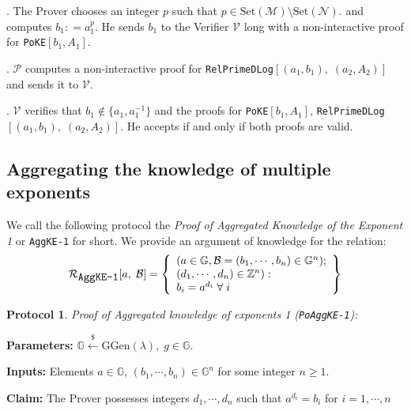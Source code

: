 \documentclass[11pt, lettersize, notitlepage, leqno, footskip=0.6cm]{article}
\newcommand{\bz}{\mathbb Z}
\newcommand{\sett}{\mr{Set}}
\newcommand{\mc}{\mathcal}
\newcommand{\mb}{\mathbb}
\newcommand{\mr}{\mathrm}
\newcommand{\lamb}{\lambda}
\newcommand{\mP}{\mc{P}}
\newcommand{\V}{\mc{V}}
\newcommand{\noin}{\noindent}
\newtheorem{Prot}[Thm]{Protocol}
\numberwithin{equation}{section}
\begin{document}
\noin 1. The Prover chooses an integer $p$ such that $p\in \sett(\mc{M})\setminus \sett(\mc{N}).$ and computes $b_1: = a_1^p$. He sends $b_1$ to the Verifier $\V$ long with a non-interactive proof for \verb|PoKE|$[b_1, A_1]$.

\noin 2. $\mP$ computes a non-interactive proof for \verb|RelPrimeDLog|$[(a_1, b_1),\; (a_2, A_2)]$ and sends it to $\V$.

\noin 3. $\V$ verifies that $b_1\notin \{ a_1, a_1^{-1}\}$ and the proofs for \verb|PoKE|$[b_1, A_1]$, \verb|RelPrimeDLog|$[(a_1, b_1),\; (a_2, A_2)]$. He accepts if and only if both proofs are valid.


\bigskip



\subsection{\fontsize{11}{11}\selectfont Aggregating the knowledge of multiple exponents}

We call the following protocol the \textit{Proof of Aggregated Knowledge of the Exponent 1} or \verb|AggKE-1| for short. We provide an argument of knowledge for the relation:
\[
  \mc{R}_{{\protect\verb|AggKE-1|}}[a,\; \mc{B}] = \left\{\begin{array}{l}
    (a\in\mb{G}, \mc{B} = (b_1,\cdots, b_n)\in\mb{G}^n);\\ 
    (d_1,\cdots,d_n)\in\bz^n):  \\
    b_i = a^{d_i}\;\forall\; i
  \end{array}\right\}
\]


\vspace{0.1cm}

\begin{Prot} \normalfont \textit{Proof of Aggregated knowledge of exponents} 1 (\verb|PoAggKE-1|):\end{Prot} \vspace{-0.3cm}

\noindent \textbf{Parameters:} $\mb{G}\xleftarrow{\$} \mr{GGen}(\lamb), \; g\in \mb{G}$.

\noindent \textbf{Inputs:} Elements $a\in\mb{G} $, $(b_1,\cdots,b_n)\in \mb{G}^n$ for some integer $n\geq 1$.

\noindent \textbf{Claim:} The Prover possesses integers $d_1,\cdots, d_n$ such that $a^{d_i} = b_i$ for $i = 1,\cdots, n$
\end{document}
